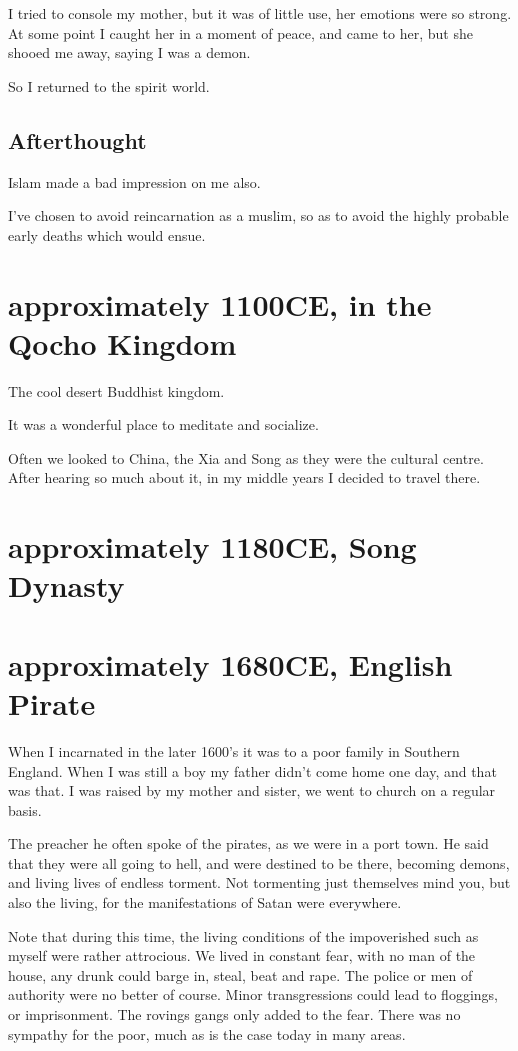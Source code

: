 I tried to console my mother, but it was of little use, her emotions were so
strong. At some point I caught her in a moment of peace, and came to her, but
she shooed me away, saying I was a demon.

So I returned to the spirit world.

\section{Afterthought}

Islam made a bad impression on me also. 

I've chosen to avoid reincarnation as a muslim, so as to avoid the highly
probable early deaths which would ensue. 

\chapter{approximately 1100CE, in the Qocho Kingdom}
The cool desert Buddhist kingdom.

It was a wonderful place to meditate and socialize. 

Often we looked to China, the Xia and Song as they were the cultural centre. 
After hearing so much about it, in my middle years I decided to travel there.

\chapter{approximately 1180CE, Song Dynasty}

\chapter{approximately 1680CE, English Pirate}
\label{reincarnation:pirate}

When I incarnated in the later 1600’s it was to a poor family in Southern England. When I was still a boy my father didn’t come home one day, and that was that.  I was raised by my mother and sister, we went to church on a regular basis.

The preacher he often spoke of the pirates, as we were in a port town.  He said
that they were all going to hell, and were destined to be there, becoming
demons, and living lives of endless torment. Not tormenting just themselves mind
you, but also the living, for the manifestations of Satan were everywhere.

Note that during this time, the living conditions of the impoverished such as myself were rather attrocious. We lived in constant fear, with no man of the house, any drunk could barge in, steal, beat and rape. The police or men of authority were no better of course. Minor transgressions could lead to floggings, or imprisonment. The rovings gangs only added to the fear.  There was no sympathy for the poor, much as is the case today in many areas.

